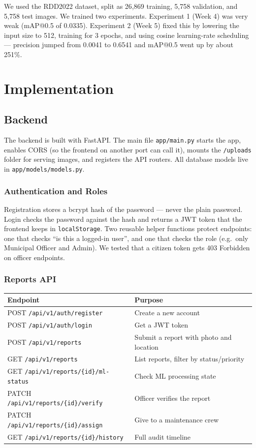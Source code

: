 \documentclass{tietreport}
\begin{document}
We used the RDD2022 dataset, split as 26{,}869 training, 5{,}758 validation, and 5{,}758 test images. We trained two experiments. Experiment 1 (Week 4) was very weak (mAP@0.5 of 0.0335). Experiment 2 (Week 5) fixed this by lowering the input size to 512, training for 3 epochs, and using cosine learning-rate scheduling --- precision jumped from 0.0041 to 0.6541 and mAP@0.5 went up by about 251\%.

\chapter{Implementation}

\section{Backend}

The backend is built with FastAPI. The main file \texttt{app/main.py} starts the app, enables CORS (so the frontend on another port can call it), mounts the \texttt{/uploads} folder for serving images, and registers the API routers. All database models live in \texttt{app/models/models.py}.

\subsection{Authentication and Roles}

Registration stores a bcrypt hash of the password --- never the plain password. Login checks the password against the hash and returns a JWT token that the frontend keeps in \texttt{localStorage}. Two reusable helper functions protect endpoints: one that checks ``is this a logged-in user'', and one that checks the role (e.g.~only Municipal Officer and Admin). We tested that a citizen token gets 403 Forbidden on officer endpoints.

\subsection{Reports API}

\begin{longtable}{|l|p{8.4cm}|}
\hline
\textbf{Endpoint} & \textbf{Purpose} \\
\hline
POST \texttt{/api/v1/auth/register} & Create a new account \\
\hline
POST \texttt{/api/v1/auth/login} & Get a JWT token \\
\hline
POST \texttt{/api/v1/reports} & Submit a report with photo and location \\
\hline
GET \texttt{/api/v1/reports} & List reports, filter by status/priority \\
\hline
GET \texttt{/api/v1/reports/\{id\}/ml-status} & Check ML processing state \\
\hline
PATCH \texttt{/api/v1/reports/\{id\}/verify} & Officer verifies the report \\
\hline
PATCH \texttt{/api/v1/reports/\{id\}/assign} & Give to a maintenance crew \\
\hline
GET \texttt{/api/v1/reports/\{id\}/history} & Full audit timeline \\
\hline
\end{longtable}
\end{document}

